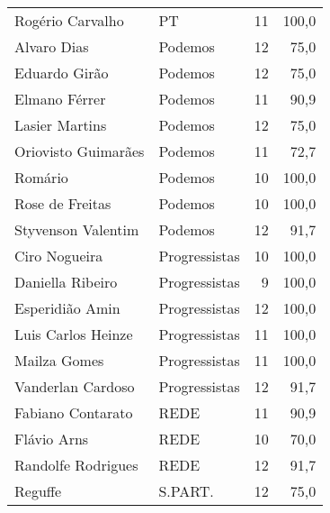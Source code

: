 \begin{longtable}{llrr}
        Rogério Carvalho &             PT &                  11 &        100,0 \\
             Alvaro Dias &        Podemos &                  12 &         75,0 \\
           Eduardo Girão &        Podemos &                  12 &         75,0 \\
           Elmano Férrer &        Podemos &                  11 &         90,9 \\
          Lasier Martins &        Podemos &                  12 &         75,0 \\
     Oriovisto Guimarães &        Podemos &                  11 &         72,7 \\
                 Romário &        Podemos &                  10 &        100,0 \\
         Rose de Freitas &        Podemos &                  10 &        100,0 \\
      Styvenson Valentim &        Podemos &                  12 &         91,7 \\
           Ciro Nogueira &  Progressistas &                  10 &        100,0 \\
        Daniella Ribeiro &  Progressistas &                   9 &        100,0 \\
         Esperidião Amin &  Progressistas &                  12 &        100,0 \\
      Luis Carlos Heinze &  Progressistas &                  11 &        100,0 \\
            Mailza Gomes &  Progressistas &                  11 &        100,0 \\
       Vanderlan Cardoso &  Progressistas &                  12 &         91,7 \\
       Fabiano Contarato &           REDE &                  11 &         90,9 \\
             Flávio Arns &           REDE &                  10 &         70,0 \\
      Randolfe Rodrigues &           REDE &                  12 &         91,7 \\
                 Reguffe &        S.PART. &                  12 &         75,0 \\
\end{longtable}
